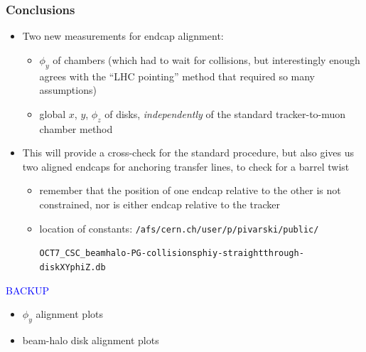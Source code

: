 \documentclass[compress]{beamer}
\begin{document}

\begin{frame}
\frametitle{Conclusions}
\begin{itemize}
\item Two new measurements for endcap alignment:
\begin{itemize}
\item $\phi_y$ of chambers (which had to wait for collisions, but interestingly enough agrees with the ``LHC pointing'' method that required so many assumptions)
\item global $x$, $y$, $\phi_z$ of disks, {\it independently} of the standard tracker-to-muon chamber method
\end{itemize}

\item This will provide a cross-check for the standard procedure, but
  also gives us two aligned endcaps for anchoring
  transfer lines, to check for a barrel twist
\begin{itemize}
\item remember that the position of one endcap relative to the other
  is not constrained, nor is either endcap relative to the tracker
\item location of constants: {\tt \scriptsize /afs/cern.ch/user/p/pivarski/public/}

{\tt \scriptsize OCT7\_CSC\_beamhalo-PG-collisionsphiy-straightthrough-diskXYphiZ.db}
\end{itemize}
\end{itemize}

\label{numpages}
\end{frame}

\begin{frame}
\begin{center}
\Huge \textcolor{blue}{BACKUP}

\normalsize
\vspace{1 cm}
\begin{minipage}{0.7\linewidth}
\begin{itemize}
\item $\phi_y$ alignment plots
\item beam-halo disk alignment plots
\end{itemize}
\end{minipage}
\end{center}
\end{frame}
\end{document}
